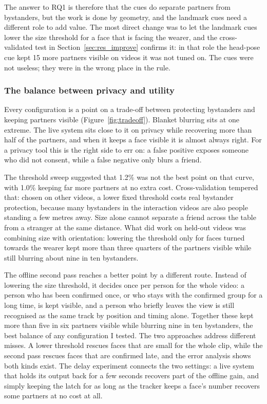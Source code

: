 The answer to RQ1 is therefore that the cues do separate partners from bystanders, but the
work is done by geometry, and the landmark cues need a different role to add value. The
most direct change was to let the landmark cues lower the size threshold for a face that
is facing the wearer, and the cross-validated test in Section~\ref{sec:res_improve}
confirms it: in that role the head-pose cue kept 15 more partners visible on videos it was
not tuned on. The cues were not useless; they were in the wrong place in the rule.

\subsubsection{The balance between privacy and utility}
\label{sec:disc_tradeoff}

Every configuration is a point on a trade-off between protecting bystanders and keeping
partners visible (Figure~\ref{fig:tradeoff}). Blanket blurring sits at one extreme. The live
system sits close to it on privacy while recovering more than half of the partners, and
when it keeps a face visible it is almost always right. For a privacy tool this is the
right side to err on: a false positive exposes someone who did not consent, while a false
negative only blurs a friend.

The threshold sweep suggested that 1.2\% was not the best point on that curve, with 1.0\%
keeping far more partners at no extra cost. Cross-validation tempered that: chosen on other
videos, a lower fixed threshold costs real bystander protection, because many bystanders in
the interaction videos are also people standing a few metres away. Size alone cannot
separate a friend across the table from a stranger at the same distance. What did work on
held-out videos was combining size with orientation: lowering the threshold only for faces
turned towards the wearer kept more than three quarters of the partners visible while still
blurring about nine in ten bystanders.

The offline second pass reaches a better point by a different route. Instead of lowering
the size threshold, it decides once per person for the whole video: a person who has been
confirmed once, or who stays with the confirmed group for a long time, is kept visible, and
a person who briefly leaves the view is still recognised as the same track by position and
timing alone. Together these kept more than five in six partners visible while blurring
nine in ten bystanders, the best balance of any configuration I tested. The two approaches address different
misses. A lower threshold rescues faces that are small for the whole clip, while the second
pass rescues faces that are confirmed late, and the error analysis shows both kinds exist.
The delay experiment connects the two settings: a live system that holds its output back
for a few seconds recovers part of the offline gain, and simply keeping the latch for as
long as the tracker keeps a face's number recovers some partners at no cost at all.

